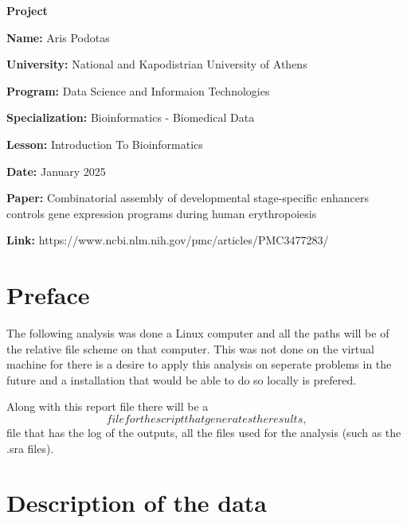 \documentclass[12pt, a4paper]{article}
\begin{document}
\begin{titlepage}
    \centering
    {\huge \textbf{Project}\par}
    \vspace{0.5cm}
    {\Large \textbf{Name:} Aris Podotas\par}
    \vspace{0.5cm}
    {\large \textbf{University:} National and Kapodistrian University of Athens\par}
    \vspace{0.5cm}
    {\large \textbf{Program:} Data Science and Informaion Technologies\par}
    \vspace{0.5cm}
    {\large \textbf{Specialization:} Bioinformatics - Biomedical Data\par}
    \vspace{0.5cm}
    {\large \textbf{Lesson:} Introduction To Bioinformatics\par}
    \vspace{0.5cm}
    {\large \textbf{Date:} January 2025\par}
    \vspace{0.5cm}
    {\large \textbf{Paper:} Combinatorial assembly of developmental stage-specific enhancers controls gene expression programs during human erythropoiesis\par}
    \vspace{0.5cm}
    {\large \textbf{Link:} https://www.ncbi.nlm.nih.gov/pmc/articles/PMC3477283/\par}
    \tableofcontents
\end{titlepage}

\section{Preface}

The following analysis was done a Linux computer and all the paths will be of the relative file scheme on that computer. This was not done on the virtual machine for there is a desire to apply this analysis on seperate problems in the future and a installation that would be able to do so locally is prefered.
\newline

Along with this report file there will be a $$ file for the script that generates the results, $$ file that has the log of the outputs, all the files used for the analysis (such as the .sra files).

\section{Description of the data}
\end{document}
